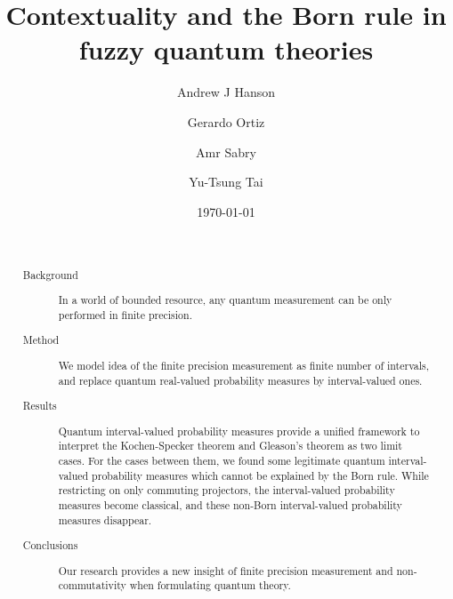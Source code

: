\documentclass[reprint, aps, prl,superscriptaddress, showpacs,
showkeys]{revtex4-1}
\theoremstyle{plain}
\theoremstyle{definition}
\begin{document}
\title{Contextuality and the Born rule in fuzzy quantum theories}

\author{Andrew J Hanson}

\author{Gerardo Ortiz}

\author{Amr Sabry}

\author{Yu-Tsung Tai}

\date{\today}

\begin{abstract}
~
\begin{description}
\item [{Background}] In a world of bounded resource, any quantum measurement
can be only performed in finite precision. {\small \par}
\item [{Method}] We model idea of the finite precision measurement as finite
number of intervals, and replace quantum real-valued probability measures
by interval-valued ones. {\small \par}
\item [{Results}] Quantum interval-valued probability measures provide
a unified framework to interpret the Kochen-Specker theorem and Gleason's
theorem as two limit cases. For the cases between them, we found some
legitimate quantum interval-valued probability measures which cannot
be explained by the Born rule. While restricting on only commuting
projectors, the interval-valued probability measures become classical,
and these non-Born interval-valued probability measures disappear. {\small \par}
\item [{Conclusions}] Our research provides a new insight of finite precision
measurement and non-commutativity when formulating quantum theory. {\small \par}
\end{description}
\end{abstract}


\end{document}
